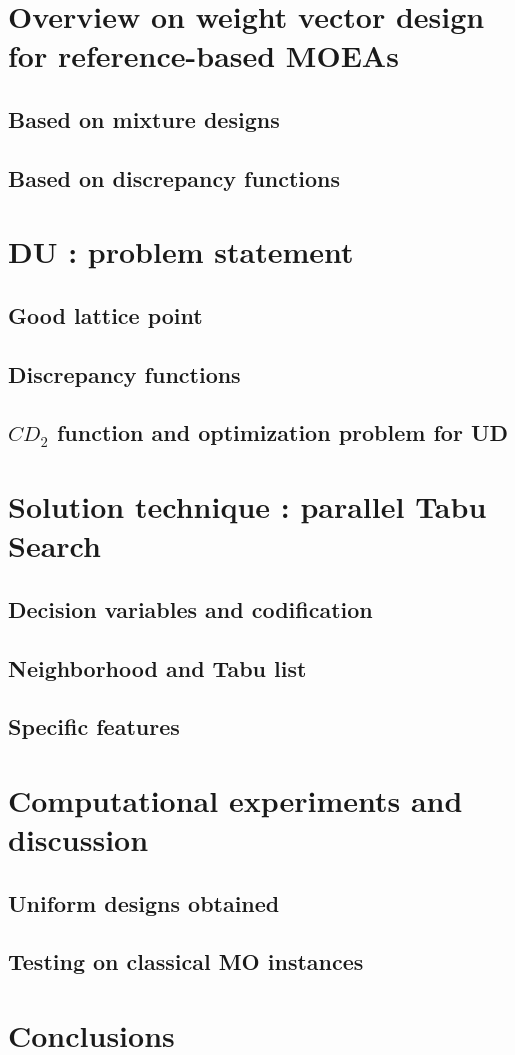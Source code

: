 \documentclass[a4paper,10pt]{llncs}
\begin{document}
\section{Overview on weight vector design for reference-based MOEAs}
\subsection{Based on mixture designs}
\subsection{Based on discrepancy functions}

\section{DU : problem statement }
\subsection{Good lattice point}
\subsection{Discrepancy functions}
\subsection{$CD_2$ function and optimization problem for UD}

\section{Solution technique : parallel Tabu Search}
\subsection{Decision variables and codification}
\subsection{Neighborhood and Tabu list}
\subsection{Specific features}


\section{Computational experiments and discussion}
\subsection{Uniform designs obtained}
\subsection{Testing on classical MO instances}

\section{Conclusions}




\end{document}
